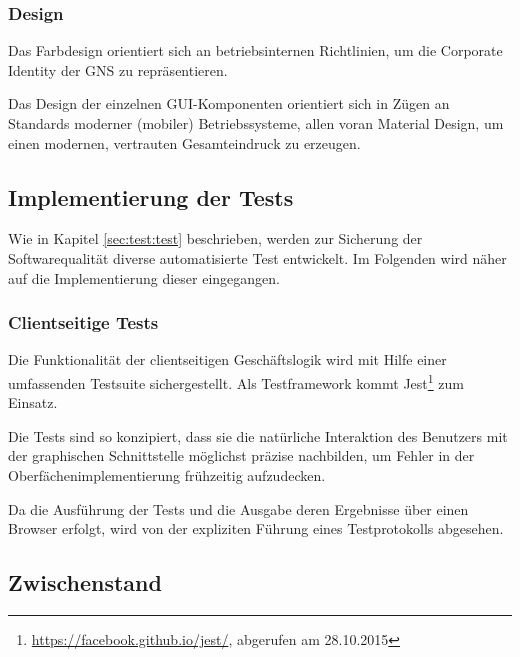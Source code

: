 \documentclass[12pt, xcolor=dvipsnames]{scrartcl}
\begin{document}
\subsubsection*{Design}

Das Farbdesign orientiert sich an betriebsinternen Richtlinien, um die Corporate Identity der GNS zu repräsentieren.

Das Design der einzelnen GUI-Komponenten orientiert sich in Zügen an Standards moderner (mobiler) Betriebssysteme, allen voran Material Design, um einen modernen, vertrauten Gesamteindruck zu erzeugen.

\subsection{Implementierung der Tests}

Wie in Kapitel \ref{sec:test:test} beschrieben, werden zur Sicherung der Softwarequalität diverse automatisierte Test entwickelt. Im Folgenden wird näher auf die Implementierung dieser eingegangen.


\subsubsection*{Clientseitige Tests}

Die Funktionalität der clientseitigen Geschäftslogik wird mit Hilfe einer umfassenden Testsuite sichergestellt. Als Testframework kommt
Jest\footnote{\url{https://facebook.github.io/jest/}, abgerufen am 28.10.2015}
zum Einsatz.

Die Tests sind so konzipiert, dass sie die natürliche Interaktion des Benutzers mit der graphischen Schnittstelle möglichst präzise nachbilden, um Fehler in der Oberfächenimplementierung frühzeitig aufzudecken.

Da die Ausführung der Tests und die Ausgabe deren Ergebnisse über einen Browser erfolgt, wird von der expliziten Führung eines Testprotokolls abgesehen.

\subsection{Zwischenstand}
\end{document}
